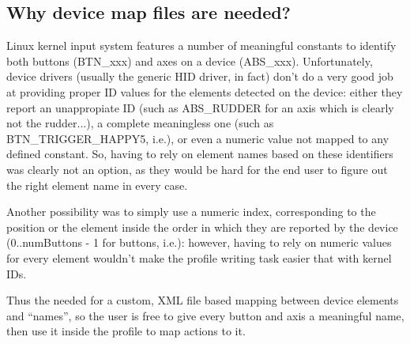 \subsection{Why device map files are needed?}
Linux kernel input system features a number of meaningful constants to identify both buttons (BTN\_xxx) and axes on a device (ABS\_xxx). Unfortunately, device drivers (usually the generic HID driver, in fact) don't do a very good job at providing proper ID values for the elements detected on the device: either they report an unappropiate ID (such as ABS\_RUDDER for an axis which is clearly not the rudder...), a complete meaningless one (such as BTN\_TRIGGER\_HAPPY5, i.e.), or even a numeric value not mapped to any defined constant. So, having to rely on element names based on these identifiers was clearly not an option, as they would be hard for the end user to figure out the right element name in every case.

Another possibility was to simply use a numeric index, corresponding to the position or the element inside the order in which they are reported by the device (0..numButtons - 1 for buttons, i.e.): however, having to rely on numeric values for every element wouldn't make the profile writing task easier that with kernel IDs.

Thus the needed for a custom, XML file based mapping between device elements and ``names'', so the user is free to give every button and axis a meaningful name, then use it inside the profile to map actions to it.

